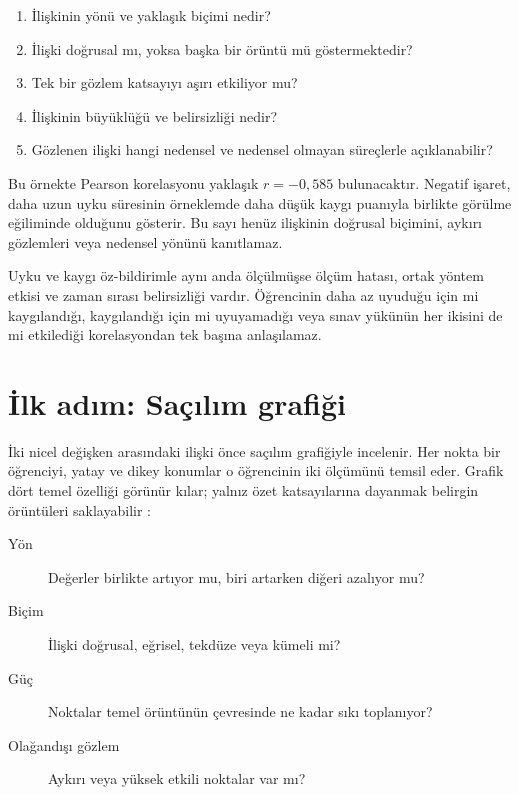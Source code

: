 \begin{enumerate}
  \item İlişkinin yönü ve yaklaşık biçimi nedir?
  \item İlişki doğrusal mı, yoksa başka bir örüntü mü göstermektedir?
  \item Tek bir gözlem katsayıyı aşırı etkiliyor mu?
  \item İlişkinin büyüklüğü ve belirsizliği nedir?
  \item Gözlenen ilişki hangi nedensel ve nedensel olmayan süreçlerle açıklanabilir?
\end{enumerate}

Bu örnekte Pearson korelasyonu yaklaşık $r=-0{,}585$ bulunacaktır. Negatif
işaret, daha uzun uyku süresinin örneklemde daha düşük kaygı puanıyla birlikte
görülme eğiliminde olduğunu gösterir. Bu sayı henüz ilişkinin doğrusal
biçimini, aykırı gözlemleri veya nedensel yönünü kanıtlamaz.

\begin{researchbox}
Uyku ve kaygı öz-bildirimle aynı anda ölçülmüşse ölçüm hatası, ortak yöntem
etkisi ve zaman sırası belirsizliği vardır. Öğrencinin daha az uyuduğu için mi
kaygılandığı, kaygılandığı için mi uyuyamadığı veya sınav yükünün her ikisini
de mi etkilediği korelasyondan tek başına anlaşılamaz.
\end{researchbox}

\section{İlk adım: Saçılım grafiği}

İki nicel değişken arasındaki ilişki önce saçılım grafiğiyle incelenir. Her
nokta bir öğrenciyi, yatay ve dikey konumlar o öğrencinin iki ölçümünü temsil
eder. Grafik dört temel özelliği görünür kılar; yalnız özet katsayılarına
dayanmak belirgin örüntüleri saklayabilir \cite{anscombe1973}:

\begin{description}
  \item[Yön] Değerler birlikte artıyor mu, biri artarken diğeri azalıyor mu?
  \item[Biçim] İlişki doğrusal, eğrisel, tekdüze veya kümeli mi?
  \item[Güç] Noktalar temel örüntünün çevresinde ne kadar sıkı toplanıyor?
  \item[Olağandışı gözlem] Aykırı veya yüksek etkili noktalar var mı?
\end{description}

